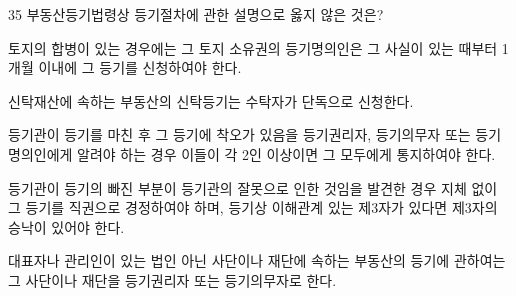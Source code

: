 \begin{question}{35}
부동산등기법령상 등기절차에 관한 설명으로 옳지 않은 것은?
\begin{choices}
  \item 토지의 합병이 있는 경우에는 그 토지 소유권의 등기명의인은 그 사실이 있는 때부터 1개월 이내에 그 등기를 신청하여야 한다.
  \item 신탁재산에 속하는 부동산의 신탁등기는 수탁자가 단독으로 신청한다.
  \item 등기관이 등기를 마친 후 그 등기에 착오가 있음을 등기권리자, 등기의무자 또는 등기명의인에게 알려야 하는 경우 이들이 각 2인 이상이면 그 모두에게 통지하여야 한다.
  \item 등기관이 등기의 빠진 부분이 등기관의 잘못으로 인한 것임을 발견한 경우 지체 없이 그 등기를 직권으로 경정하여야 하며, 등기상 이해관계 있는 제3자가 있다면 제3자의 승낙이 있어야 한다.
  \item 대표자나 관리인이 있는 법인 아닌 사단이나 재단에 속하는 부동산의 등기에 관하여는 그 사단이나 재단을 등기권리자 또는 등기의무자로 한다.
\end{choices}
\end{question}
